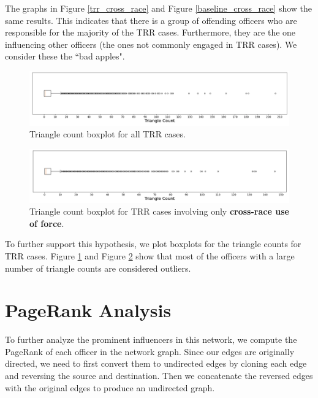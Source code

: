 \documentclass[10pt]{article}
\begin{document}
The graphs in Figure \ref{trr_cross_race} and Figure \ref{baseline_cross_race} show the same results. This indicates that there is a group of offending officers who are responsible for the majority of the TRR cases. Furthermore, they are the one influencing other officers (the ones not commonly engaged in TRR cases). We consider these the ``bad apples".

\begin{figure}[H]
\centering
\includegraphics[width=\textwidth]{triangle_count}
\caption{Triangle count boxplot for all TRR cases.}
\label{triangle_count}
\end{figure}

\begin{figure}[H]
\centering
\includegraphics[width=\textwidth]{triangle_count_cross_race}
\caption{Triangle count boxplot for TRR cases involving only \textbf{cross-race use of force}.}
\label{triangle_count_cross_race}
\end{figure}

To further support this hypothesis, we plot boxplots for the triangle counts for TRR cases. Figure \ref{triangle_count} and Figure \ref{triangle_count_cross_race} show that most of the officers with a large number of triangle counts are considered outliers.



\section{PageRank Analysis}

To further analyze the prominent influencers in this network, we compute the PageRank of each officer in the network graph. Since our edges are originally directed, we need to first convert them to undirected edges by cloning each edge and reversing the source and destination. Then we concatenate the reversed edges with the original edges to produce an undirected graph.
\end{document}
